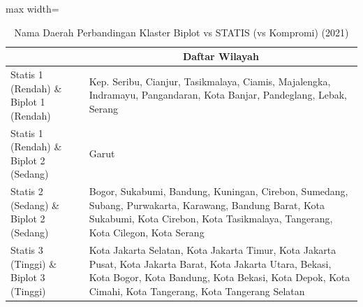 \begin{table}[H]
\centering
\caption{Nama Daerah Perbandingan Klaster Biplot vs STATIS (vs Kompromi) (2021)} \label{tab:app1biplot_statis_name_2021}
\begin{adjustbox}{max width=\textwidth}
\begin{tabular}{|>{\centering\arraybackslash}p{4cm}|p{10cm}|}
\hline
\multicolumn{1}{|c|}{\textbf{Kategori}} & \multicolumn{1}{c|}{\textbf{Daftar Wilayah}} \\
\hline
Statis 1 (Rendah) \& Biplot 1 (Rendah) & Kep. Seribu, Cianjur, Tasikmalaya, Ciamis, Majalengka, Indramayu, Pangandaran, Kota Banjar, Pandeglang, Lebak, Serang \\
\hline
Statis 1 (Rendah) \& Biplot 2 (Sedang) & Garut \\
\hline
Statis 2 (Sedang) \& Biplot 2 (Sedang) & Bogor, Sukabumi, Bandung, Kuningan, Cirebon, Sumedang, Subang, Purwakarta, Karawang, Bandung Barat, Kota Sukabumi, Kota Cirebon, Kota Tasikmalaya, Tangerang, Kota Cilegon, Kota Serang \\
\hline
Statis 3 (Tinggi) \& Biplot 3 (Tinggi) & Kota Jakarta Selatan, Kota Jakarta Timur, Kota Jakarta Pusat, Kota Jakarta Barat, Kota Jakarta Utara, Bekasi, Kota Bogor, Kota Bandung, Kota Bekasi, Kota Depok, Kota Cimahi, Kota Tangerang, Kota Tangerang Selatan \\
\hline
\end{tabular}
\end{adjustbox}
\end{table}